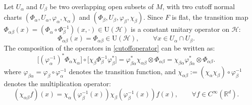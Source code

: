 \documentclass[11pt,oneside,reqno]{amsart}
\newcommand\R{\ensuremath{\mathbb{R}}}
\theoremstyle{definition}
\numberwithin{equation}{section}
\theoremstyle{plain}
\begin{document}
Let $U_\alpha$ and $U_\beta$ be two overlapping open subsets of $M$, with two cutoff normal charts $(\Phi_\alpha,U_\alpha,\varphi_\alpha,\chi_\alpha)$ and $(\Phi_\beta,U_\beta,\varphi_\beta,\chi_\beta)$. Since $F$ is flat, the transition map $\Phi_{\alpha\beta}(x)=(\Phi_\alpha \circ \Phi_\beta^{-1})(x,\cdot) \in \mathrm{U}(\mathcal{H})$ is a constant unitary operator on $\mathcal{H}$: 
\begin{equation*}
    \Phi_{\alpha \beta} (x) = \Phi_{\alpha \beta} \in \mathrm{U} (\mathcal{H}), \qquad \forall x  \in U_\alpha \cap U_\beta.
\end{equation*}
The composition of the operators in \eqref{cutoffoperator} can be written as:
\begin{equation}\label{transitionmapform}
 \big[ (\varphi_\alpha^{-1})^* \Phi_\alpha \chi_\alpha \big] \circ \big[ \chi_\beta \Phi_\beta^{-1} \varphi_\beta^* \big] = \varphi_{\beta \alpha}^* \chi_{\alpha \beta} \otimes \Phi_{\alpha \beta} =  \chi_{\beta \alpha }  \varphi_{\beta \alpha}^* \otimes \Phi_{\alpha \beta}  . 
\end{equation}
where $\varphi_{\beta \alpha} = \varphi_\beta \circ \varphi_\alpha^{-1}$ denotes the transition function, and $\chi_{\alpha \beta} := (\chi_\alpha \chi_\beta) \circ \varphi_\beta^{-1}$ denotes the multiplication operator:
\begin{equation*}
    (\chi_{\alpha \beta} f)(x)= \chi_\alpha (\varphi_\beta^{-1}(x)) \chi_\beta (\varphi_\beta^{-1}(x))  f(x), \qquad \forall f\in C^{\infty}(\mathbb{R}^d).
\end{equation*}


\end{document}
